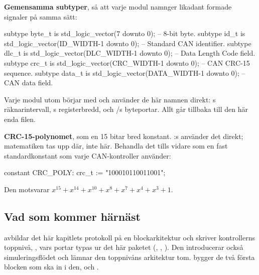 \textbf{Gemensamma subtyper}, så att varje modul namnger likadant formade signaler på samma sätt:

\begin{vhdlcode}
subtype byte_t is std_logic_vector(7 downto 0);            -- 8-bit byte.
subtype id_t   is std_logic_vector(ID_WIDTH-1 downto 0);   -- Standard CAN identifier.
subtype dlc_t  is std_logic_vector(DLC_WIDTH-1 downto 0);  -- Data Length Code field.
subtype crc_t  is std_logic_vector(CRC_WIDTH-1 downto 0);  -- CAN CRC-15 sequence.
subtype data_t is std_logic_vector(DATA_WIDTH-1 downto 0); -- CAN data field.
\end{vhdlcode}

Varje modul utom  börjar med  och använder de här namnen
direkt: s räknarintervall, s registerbredd, och
/s byteportar. Allt går tillbaka till den här enda filen.

\textbf{CRC-15-polynomet}, som en 15 bitar bred konstant. :s  använder
det direkt; matematiken tas upp där, inte här. Behandla det tills vidare som en fast standardkonstant
som varje CAN-kontroller använder:

\begin{vhdlcode}
constant CRC_POLY: crc_t := "100010110011001";
\end{vhdlcode}

Den motsvarar $x^{15} + x^{14} + x^{10} + x^{8} + x^{7} + x^{4} + x^{3} + 1$.

\subsection*{Vad som kommer härnäst}
 avbildar det här kapitlets protokoll på en blockarkitektur och skriver kontrollerns
toppnivå, , vars portar typas ur det här paketet (, ,
). Den introducerar också simuleringsflödet och lämnar den toppnivåns arkitektur tom.
 bygger de två första blocken som ska in i den,  och
.
